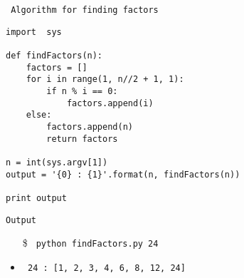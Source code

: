\begin{center}
\texttt{ Algorithm for finding factors}
\end{center}
\begin{verbatim}
import  sys

def findFactors(n):
	factors = []
	for i in range(1, n//2 + 1, 1):
		if n % i == 0:
			factors.append(i)
	else:
		factors.append(n)
		return factors

n = int(sys.argv[1])
output = '{0} : {1}'.format(n, findFactors(n))

print output
\end{verbatim}
\begin{center}
\texttt{Output}
\end{center}
\begin{itemize}
\item[\$]\texttt{ python findFactors.py 24}
\item\texttt{ 24 : [1, 2, 3, 4, 6, 8, 12, 24]}
\end{itemize}
